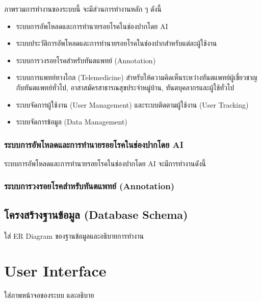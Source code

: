 ภาพรวมการทำงานของระบบนี้ จะมีส่วนการทำงานหลัก ๆ ดังนี้
\begin{itemize}
    \item ระบบการอัพโหลดและการทำนายรอยโรคในช่องปากโดย AI
    \item ระบบประวัติการอัพโหลดและการทำนายรอยโรคในช่องปากสำหรับแต่ละผู้ใช้งาน
    \item ระบบการวงรอยโรคสำหรับทันตแพทย์ (Annotation)
    \item ระบบการแพทย์ทางไกล (Telemedicine) สำหรับให้ความคิดเห็นระหว่างทันตแพทย์ผู้เชี่ยวชาญกับทันตแพทย์ทั่วไป, อาสาสมัครสาธารณสุขประจำหมู่บ้าน, ทันตบุคลากรและผู้ใช้ทั่วไป
    \item ระบบจัดการผู้ใช้งาน (User Management) และระบบติดตามผู้ใช้งาน (User Tracking)
    \item ระบบจัดการข้อมูล (Data Management)
\end{itemize}

\subsubsection{ระบบการอัพโหลดและการทำนายรอยโรคในช่องปากโดย AI}
ระบบการอัพโหลดและการทำนายรอยโรคในช่องปากโดย AI จะมีการทำงานดังนี้

\subsubsection{ระบบการวงรอยโรคสำหรับทันตแพทย์ (Annotation)}

\subsub



\subsection{โครงสร้างฐานข้อมูล (Database Schema)}
ใส่ ER Diagram ของฐานข้อมูลและอธิบายการทำงาน

\section{User Interface}
ใส่ภาพหน้าจอของระบบ และอธิบาย